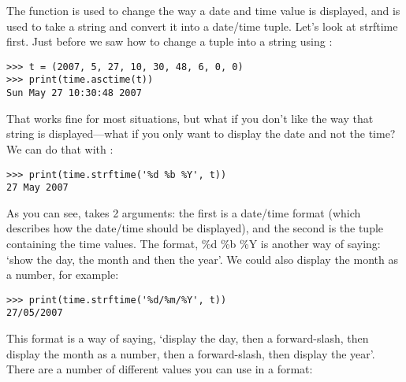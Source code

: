 The function  is used to change the way a date and time value is displayed, and  is used to take a string and convert it into a date/time tuple. Let's look at strftime first.  Just before we saw how to change a tuple into a string using :

\begin{listing}
\begin{verbatim}
>>> t = (2007, 5, 27, 10, 30, 48, 6, 0, 0)
>>> print(time.asctime(t))
Sun May 27 10:30:48 2007
\end{verbatim}
\end{listing}

\noindent
That works fine for most situations, but what if you don't like the way that string is displayed---what if you only want to display the date and not the time?  We can do that with :

\begin{listing}
\begin{verbatim}
>>> print(time.strftime('%d %b %Y', t))
27 May 2007
\end{verbatim}
\end{listing}

As you can see,  takes 2 arguments:  the first is a date/time format (which describes how the date/time should be displayed), and the second is the tuple containing the time values.  The format, \%d \%b \%Y is another way of saying: `show the day, the month and then the year'.  We could also display the month as a number, for example:

\begin{listing}
\begin{verbatim}
>>> print(time.strftime('%d/%m/%Y', t))
27/05/2007
\end{verbatim}
\end{listing}

This format is a way of saying, `display the day, then a forward-slash, then display the month as a number, then a forward-slash, then display the year'.  There are a number of different values you can use in a format:

